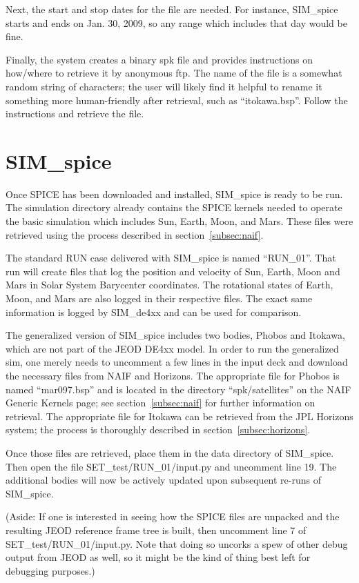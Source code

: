Next, the start and stop dates for the file are needed. For instance,
SIM\_spice starts and ends on Jan. 30, 2009, so any range which includes that
day would be fine.

Finally, the system creates a binary spk file and provides instructions on
how/where to retrieve it by anonymous ftp. The name of the file is a somewhat
random string of characters; the user will likely find it helpful to rename
it something more human-friendly after retrieval, such as ``itokawa.bsp''.
Follow the instructions and retrieve the file.


\section{SIM\_spice}
Once SPICE has been downloaded and installed, SIM\_spice is ready to be run.
The simulation directory already contains the SPICE kernels needed to operate the
basic simulation which includes Sun, Earth, Moon, and Mars.  These files were
retrieved using the process described in section~\ref{subsec:naif}.

The standard RUN case delivered with SIM\_spice is named ``RUN\_01''. That run
will create files that log the position and velocity of Sun, Earth, Moon and
Mars in Solar System Barycenter coordinates. The rotational states of Earth,
Moon, and Mars are also logged in their respective files. The exact same
information is logged by SIM\_de4xx and can be used for comparison.

The generalized version of SIM\_spice includes two bodies, Phobos and Itokawa,
which are not part of the JEOD DE4xx model. In order to run the generalized sim,
one merely needs to uncomment a few lines in the input deck and download the
necessary files from NAIF and Horizons.  The appropriate file for Phobos is
named ``mar097.bsp'' and is located in the directory ``spk/satellites'' on
the NAIF Generic Kernels page; see section~\ref{subsec:naif} for further
information on retrieval.  The appropriate file for Itokawa can be retrieved
from the JPL Horizons system; the process is thoroughly described in
section~\ref{subsec:horizons}.

Once those files are retrieved, place them in the data directory of
SIM\_spice. Then open the file SET\_test/RUN\_01/input.py and uncomment
line 19. The additional bodies will now be actively updated upon subsequent
re-runs of SIM\_spice.

(Aside: If one is interested in seeing how the SPICE files are unpacked
and the resulting JEOD reference frame tree is built, then uncomment line 7 of
SET\_test/RUN\_01/input.py. Note that doing so uncorks a spew of other debug
output from JEOD as well, so it might be the kind of thing best left for
debugging purposes.)


